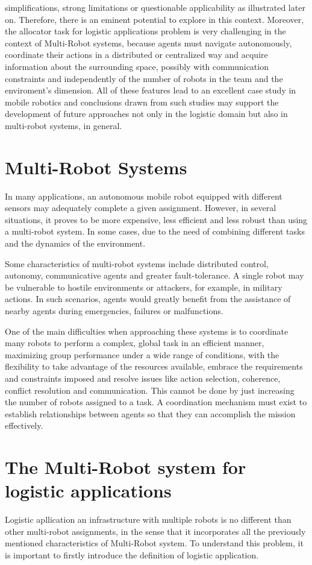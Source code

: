 simplifications, strong limitations or questionable applicability as illustrated later
on. Therefore, there is an eminent potential to explore in this context.
\newline
Moreover, the allocator task for logistic applications problem is very challenging
in the context of Multi-Robot systems, because agents must navigate autonomously,
coordinate their actions in a distributed or centralized way and acquire information
about the surrounding space, possibly with communication constraints and independently
of the number of robots in the team and the enviroment's dimension.
All of these features lead to an excellent case study in mobile robotics
and conclusions drawn from such studies may support the development of future
approaches not only in the logistic domain but also in multi-robot systems, in
general.

\section{Multi-Robot Systems}
In many applications, an autonomous mobile robot equipped with different
sensors may adequately complete a given assignment. However, in several situations,
it proves to be more expensive, less efficient and less robust than using a multi-robot system.
In some cases, due to the need of combining different tasks and the dynamics of the environment.

Some characteristics of multi-robot systems include distributed control, autonomy,
communicative agents and greater fault-tolerance.
A single robot may be vulnerable to hostile environments or attackers, for example, in military actions.
In such scenarios, agents would greatly benefit from the assistance of nearby agents during emergencies,
failures or malfunctions.

One of the main difficulties when approaching these systems is to coordinate
many robots to perform a complex, global task in an efficient manner, maximizing
group performance under a wide range of conditions, with the flexibility to take
advantage of the resources available, embrace the requirements and constraints
imposed and resolve issues like action selection, coherence, conflict resolution and
communication. This cannot be done by just increasing the number of robots
assigned to a task.
A coordination mechanism must exist to establish relationships between agents so
that they can accomplish the mission effectively.

\section{The Multi-Robot system for logistic applications}
Logistic apllication an infrastructure with multiple robots is no different than other multi-robot
assignments, in the sense that it incorporates all the previously mentioned
characteristics of Multi-Robot system. To understand this problem, it is important to firstly
introduce the definition of logistic application.


